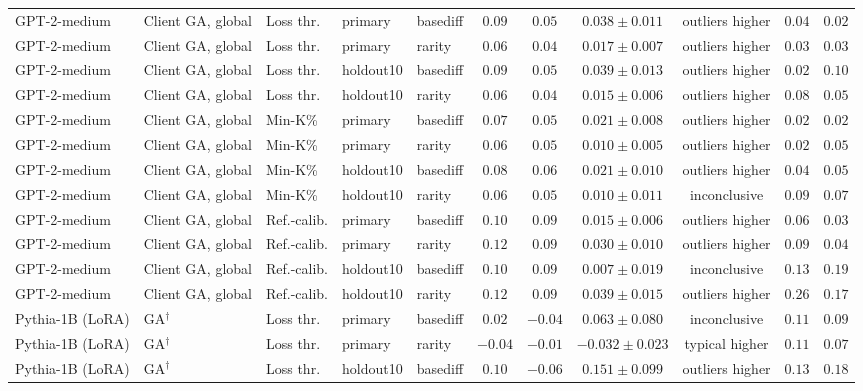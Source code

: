 \begin{table}[t]
\begin{tabular*}{\textwidth}{@{\extracolsep{\fill}}lllllcccccc@{}}
GPT-2-medium & Client GA, global & Loss thr. & primary & basediff & $0.09$ & $0.05$ & $0.038 \pm 0.011$ & outliers higher & $0.04$ & $0.02$ \\
GPT-2-medium & Client GA, global & Loss thr. & primary & rarity & $0.06$ & $0.04$ & $0.017 \pm 0.007$ & outliers higher & $0.03$ & $0.03$ \\
GPT-2-medium & Client GA, global & Loss thr. & holdout10 & basediff & $0.09$ & $0.05$ & $0.039 \pm 0.013$ & outliers higher & $0.02$ & $0.10$ \\
GPT-2-medium & Client GA, global & Loss thr. & holdout10 & rarity & $0.06$ & $0.04$ & $0.015 \pm 0.006$ & outliers higher & $0.08$ & $0.05$ \\
GPT-2-medium & Client GA, global & Min-K\% & primary & basediff & $0.07$ & $0.05$ & $0.021 \pm 0.008$ & outliers higher & $0.02$ & $0.02$ \\
GPT-2-medium & Client GA, global & Min-K\% & primary & rarity & $0.06$ & $0.05$ & $0.010 \pm 0.005$ & outliers higher & $0.02$ & $0.05$ \\
GPT-2-medium & Client GA, global & Min-K\% & holdout10 & basediff & $0.08$ & $0.06$ & $0.021 \pm 0.010$ & outliers higher & $0.04$ & $0.05$ \\
GPT-2-medium & Client GA, global & Min-K\% & holdout10 & rarity & $0.06$ & $0.05$ & $0.010 \pm 0.011$ & inconclusive & $0.09$ & $0.07$ \\
GPT-2-medium & Client GA, global & Ref.-calib. & primary & basediff & $0.10$ & $0.09$ & $0.015 \pm 0.006$ & outliers higher & $0.06$ & $0.03$ \\
GPT-2-medium & Client GA, global & Ref.-calib. & primary & rarity & $0.12$ & $0.09$ & $0.030 \pm 0.010$ & outliers higher & $0.09$ & $0.04$ \\
GPT-2-medium & Client GA, global & Ref.-calib. & holdout10 & basediff & $0.10$ & $0.09$ & $0.007 \pm 0.019$ & inconclusive & $0.13$ & $0.19$ \\
GPT-2-medium & Client GA, global & Ref.-calib. & holdout10 & rarity & $0.12$ & $0.09$ & $0.039 \pm 0.015$ & outliers higher & $0.26$ & $0.17$ \\
Pythia-1B (LoRA) & GA$^{\dagger}$ & Loss thr. & primary & basediff & $0.02$ & $-0.04$ & $0.063 \pm 0.080$ & inconclusive & $0.11$ & $0.09$ \\
Pythia-1B (LoRA) & GA$^{\dagger}$ & Loss thr. & primary & rarity & $-0.04$ & $-0.01$ & $-0.032 \pm 0.023$ & typical higher & $0.11$ & $0.07$ \\
Pythia-1B (LoRA) & GA$^{\dagger}$ & Loss thr. & holdout10 & basediff & $0.10$ & $-0.06$ & $0.151 \pm 0.099$ & outliers higher & $0.13$ & $0.18$ \\

\end{tabular*}
\end{table}
